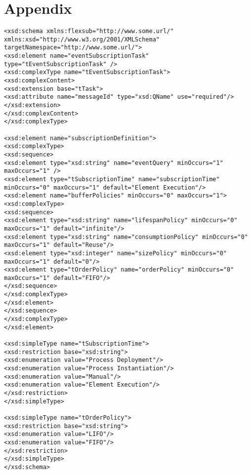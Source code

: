 \chapter{Appendix}

\begin{lstlisting}[basicstyle=\scriptsize,caption={XSD schema of the BPMN extension for flexible event subscription},label=lst:xsd-flexsub]
<xsd:schema xmlns:flexsub="http://www.some.url/" xmlns:xsd="http://www.w3.org/2001/XMLSchema" targetNamespace="http://www.some.url/">
<xsd:element name="eventSubscriptionTask" type="tEventSubscriptionTask" />
<xsd:complexType name="tEventSubscriptionTask">
<xsd:complexContent>
<xsd:extension base="tTask">
<xsd:attribute name="messageId" type="xsd:QName" use="required"/>
</xsd:extension>
</xsd:complexContent>
</xsd:complexType>

<xsd:element name="subscriptionDefinition">
<xsd:complexType>
<xsd:sequence>
<xsd:element type="xsd:string" name="eventQuery" minOccurs="1" maxOccurs="1" />
<xsd:element type="tSubscriptionTime" name="subscriptionTime" minOccurs="0" maxOccurs="1" default="Element Execution"/>
<xsd:element name="bufferPolicies" minOccurs="0" maxOccurs="1">
<xsd:complexType>
<xsd:sequence>
<xsd:element type="xsd:string" name="lifespanPolicy" minOccurs="0" maxOccurs="1" default="infinite"/>
<xsd:element type="xsd:string" name="consumptionPolicy" minOccurs="0" maxOccurs="1" default="Reuse"/>
<xsd:element type="xsd:integer" name="sizePolicy" minOccurs="0" maxOccurs="1" default="0"/>
<xsd:element type="tOrderPolicy" name="orderPolicy" minOccurs="0" maxOccurs="1" default="FIFO"/>
</xsd:sequence>
</xsd:complexType>
</xsd:element>
</xsd:sequence>
</xsd:complexType>
</xsd:element>

<xsd:simpleType name="tSubscriptionTime">
<xsd:restriction base="xsd:string">
<xsd:enumeration value="Process Deployment"/>
<xsd:enumeration value="Process Instantiation"/>
<xsd:enumeration value="Manual"/>
<xsd:enumeration value="Element Execution"/>
</xsd:restriction>
</xsd:simpleType>

<xsd:simpleType name="tOrderPolicy">
<xsd:restriction base="xsd:string">
<xsd:enumeration value="LIFO"/>
<xsd:enumeration value="FIFO"/>
</xsd:restriction>
</xsd:simpleType>
</xsd:schema>
\end{lstlisting}


